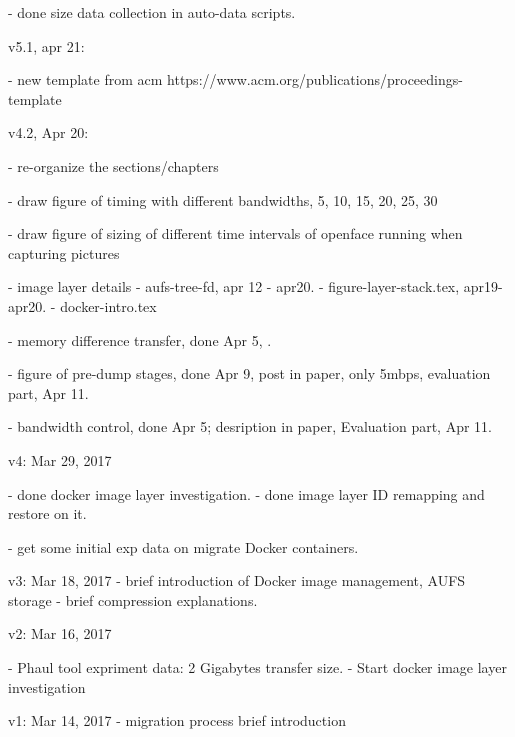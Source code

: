  - done size data collection in auto-data scripts.

v5.1, apr 21:

 - new template from acm
    https://www.acm.org/publications/proceedings-template
 
v4.2, Apr 20: 

 - re-organize the sections/chapters
 
 - draw figure of timing with different bandwidths, 5, 10, 15, 20, 25, 30
 
 - draw figure of sizing of different time intervals of openface running when capturing pictures
 
 - image layer details
    - aufs-tree-fd, apr 12 - apr20.
    - figure-layer-stack.tex, apr19-apr20.
    - docker-intro.tex
 
 - memory difference transfer, done Apr 5, .
 
 - figure of pre-dump stages, done Apr 9, post in paper, only 5mbps, evaluation part, Apr 11.
 
 - bandwidth control, done Apr 5; desription in paper, Evaluation part, Apr 11.

v4: Mar 29, 2017
    
    - done docker image layer investigation.
    - done image layer ID remapping and restore on it.
    
    - get some initial exp data on migrate Docker containers.
    

v3: Mar 18, 2017
    - brief introduction of Docker image management, AUFS storage
    - brief compression explanations.
    
v2: Mar 16, 2017

    - Phaul tool expriment data: 2 Gigabytes transfer size. 
    - Start docker image layer investigation

v1: Mar 14, 2017
    - migration process brief introduction


\fi

